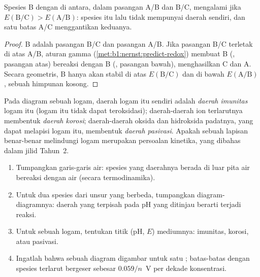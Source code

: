\begin{proposition}\label{prop:b1:e-ph-diagrams:disproportionation-criterion}
Spesies B dengan  di antara, dalam pasangan A/B dan
B/C, mengalami  jika $E(\mathrm{B}/\mathrm{C}) > E(\mathrm{A}/\mathrm{B})$:
spesies itu lalu tidak mempunyai daerah sendiri, dan satu batas A/C
menggantikan keduanya.
\end{proposition}

\begin{proof}
B adalah  pasangan B/C dan  pasangan A/B. Jika pasangan
B/C terletak di atas A/B, aturan gamma (\cref{met:b1:nernst:predict-redox})
membuat B (, pasangan atas) bereaksi dengan B (,
pasangan bawah), menghasilkan C dan A. Secara geometris, B hanya akan
stabil di atas $E(\mathrm{B}/\mathrm{C})$
dan di bawah $E(\mathrm{A}/\mathrm{B})$, sebuah himpunan kosong.
\end{proof}

\begin{definition}\label{def:b1:e-ph-diagrams:corrosion-domains}
Pada diagram sebuah logam, daerah logam itu sendiri adalah \emph{daerah
imunitas} logam itu (logam itu tidak dapat
teroksidasi);
daerah-daerah ion terlarutnya membentuk \emph{daerah
korosi}; daerah-daerah oksida dan hidroksida
padatnya, yang dapat melapisi logam itu, membentuk \emph{daerah
pasivasi}. Apakah sebuah lapisan benar-benar
melindungi logam merupakan persoalan kinetika, yang dibahas dalam jilid
Tahun~2.
\end{definition}

\begin{method}\label{met:b1:e-ph-diagrams:read}
\begin{enumerate}
  \item Tumpangkan garis-garis air: spesies yang daerahnya berada di luar
        pita air bereaksi dengan air (secara termodinamika).
  \item Untuk dua spesies dari unsur yang berbeda, tumpangkan
        diagram-diagramnya: daerah yang terpisah pada pH yang ditinjau
        berarti terjadi reaksi.
  \item Untuk sebuah logam, tentukan titik (pH, $E$) mediumnya: imunitas,
        korosi, atau pasivasi.
  \item Ingatlah bahwa sebuah diagram digambar untuk satu ; batas-batas dengan spesies terlarut bergeser sebesar
        $0.059/n$~V per dekade konsentrasi.
\end{enumerate}
\end{method}

